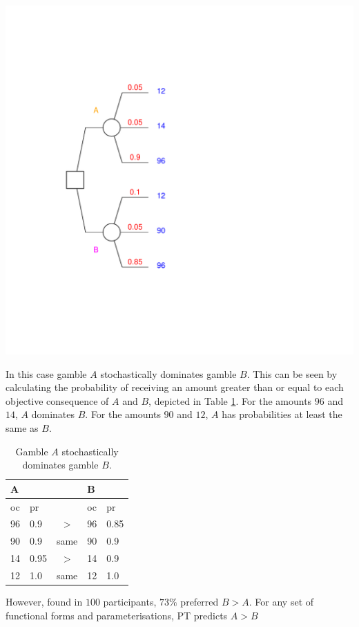 \documentclass{article}\usepackage[]{graphicx}\usepackage[]{color}
\newenvironment{knitrout}{}{} %
\begin{document}
\begin{knitrout}
{\centering \includegraphics[width=0.8\linewidth]{figure/unnamed-chunk-46} 

}



\end{knitrout}


In this case gamble $A$ stochastically dominates gamble $B$. This can be seen by calculating the probability of receiving an amount greater than or equal to each objective consequence of $A$ and $B$, depicted in
Table \ref{stochastic_dominance_table}. For the amounts $96$ and $14$, $A$ dominates $B$. For the amounts $90$ and
$12$, $A$ has probabilities at least the same as $B$.

\begin{table}[!h]
\caption{Gamble $A$ stochastically dominates gamble $B$.}
\centering
\begin{tabular}{ l l c l l }
\hline
A &   &   & B &   \\
\hline
oc & pr  &   & oc & pr  \\
\hline
96 & 0.9 & $>$ & 96 & 0.85 \\
90 & 0.9 & same & 90 & 0.9 \\
14 & 0.95 & $>$ & 14 & 0.9 \\
12 & 1.0 & same & 12 & 1.0 \\
\hline
\end{tabular}
\label{stochastic_dominance_table}
\end{table}

However, \citet[][Table 1 p. 61]{Birnbaum_Navarrete_1998} found in $100$ participants, $73\%$ preferred $B > A$.
For any set of functional forms and parameterisations, PT predicts $A > B$
\end{document}
